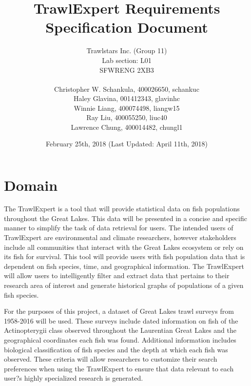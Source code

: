 \documentclass{article}
\begin{document}
\title{\textbf{TrawlExpert Requirements Specification Document}}
\author{Trawlstars Inc. (Group 11) \\ Lab section: L01 \\SFWRENG 2XB3 \\ \\ Christopher W. Schankula, 400026650, schankuc \\ Haley Glavina, 001412343, glavinhc \\ Winnie Liang, 400074498, liangw15 \\ Ray Liu, 400055250, liuc40 \\ Lawrence Chung, 400014482, chungl1}
\date{February 25th, 2018 (Last Updated: April 11th, 2018)}

\maketitle

\newpage


\section{Domain}
The TrawlExpert is a tool that will provide statistical data on fish populations throughout the Great Lakes. This data will be presented in a concise and specific manner to simplify the task of data retrieval for users. The intended users of TrawlExpert are environmental and climate researchers, however stakeholders include all communities that interact with the Great Lakes ecosystem or rely on its fish for survival. This tool will provide users with fish population data that is dependent on fish species, time, and geographical information. The TrawlExpert will allow users to intelligently filter and extract data that pertains to their research area of interest and generate historical graphs of populations of a given fish species.

For the purposes of this project, a dataset of Great Lakes trawl surveys from 1958-2016 will be used. These surveys include dated information on fish of the Actinopterygii class observed throughout the Laurentian Great Lakes and the geographical coordinates each fish was found. Additional information includes biological classification of fish species and the depth at which each fish was observed. These criteria will allow researchers to customize their search preferences when using the TrawlExpert to ensure that data relevant to each user?s highly specialized research is generated.
\end{document}
